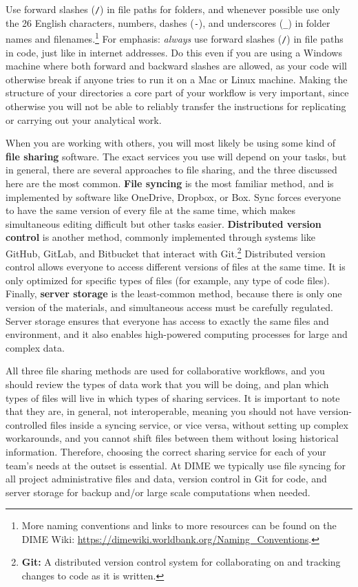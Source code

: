 \documentclass[
]{book}
\begin{document}
Use forward slashes (\texttt{/}) in file paths for folders,
and whenever possible use only the 26 English characters, numbers,
dashes (\texttt{-}), and underscores (\texttt{\_}) in folder names and filenames.\footnote{More naming conventions and links to more resources
  can be found on the DIME Wiki:
  \url{https://dimewiki.worldbank.org/Naming_Conventions}.}
For emphasis: \emph{always} use forward slashes (\texttt{/})
in file paths in code, just like in internet addresses.
Do this even if you are using a Windows machine where
both forward and backward slashes are allowed,
as your code will otherwise break
if anyone tries to run it on a Mac or Linux machine.
Making the structure of your directories a core part of your workflow is very important,
since otherwise you will not be able to reliably transfer the instructions
for replicating or carrying out your analytical work.

When you are working with others, you will most likely be using
some kind of \textbf{file sharing} software.
The exact services you use will depend on your tasks,
but in general, there are several approaches to file sharing,
and the three discussed here are the most common.
\textbf{File syncing} is the most familiar method,
and is implemented by software like OneDrive, Dropbox, or Box.
Sync forces everyone to have the same version of every file at the same time,
which makes simultaneous editing difficult but other tasks easier.
\textbf{Distributed version control} is another method,
commonly implemented through systems like GitHub, GitLab, and Bitbucket
that interact with Git.\footnote{\textbf{Git:} A distributed version control system for collaborating on and tracking changes to code as it is written.}
Distributed version control allows everyone
to access different versions of files at the same time.
It is only optimized for specific types of files
(for example, any type of code files).
Finally, \textbf{server storage} is the least-common method,
because there is only one version of the materials,
and simultaneous access must be carefully regulated.
Server storage ensures that everyone has access
to exactly the same files and environment, and it also enables
high-powered computing processes for large and complex data.

All three file sharing methods are used for collaborative workflows,
and you should review the types of data work
that you will be doing, and plan which types of files
will live in which types of sharing services.
It is important to note that they are, in general, not interoperable,
meaning you should not have version-controlled files inside a syncing service,
or vice versa, without setting up complex workarounds,
and you cannot shift files between them without losing historical information.
Therefore, choosing the correct sharing service for each of your team's needs at the outset is essential.
At DIME we typically use file syncing for all project administrative files and data,
version control in Git for code,
and server storage for backup and/or large scale computations when needed.
\end{document}
